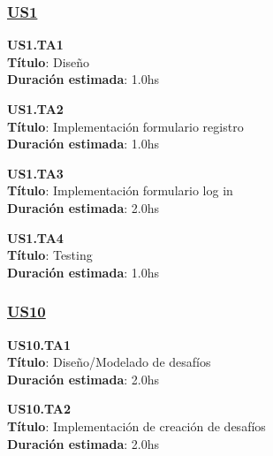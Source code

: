 \subsubsection*{\underline{US1}}

\begin{tcolorbox}
\textbf{US1.TA1} \\
\textbf{Título}: Diseño \\
\textbf{Duración estimada}: 1.0hs
\end{tcolorbox}
\vspace{10pt}

\begin{tcolorbox}
\textbf{US1.TA2} \\
\textbf{Título}:  Implementación formulario registro\\
\textbf{Duración estimada}: 1.0hs
\end{tcolorbox}
\vspace{10pt}

\begin{tcolorbox}
\textbf{US1.TA3} \\
\textbf{Título}: Implementación formulario log in \\
\textbf{Duración estimada}: 2.0hs
\end{tcolorbox}
\vspace{10pt}

\begin{tcolorbox}
\textbf{US1.TA4} \\
\textbf{Título}: Testing \\
\textbf{Duración estimada}: 1.0hs
\end{tcolorbox}
\vspace{10pt}

\subsubsection*{\underline{US10}}

\begin{tcolorbox}
\textbf{US10.TA1} \\
\textbf{Título}: Diseño/Modelado de desafíos \\
\textbf{Duración estimada}: 2.0hs
\end{tcolorbox}
\vspace{10pt}

\begin{tcolorbox}
\textbf{US10.TA2} \\
\textbf{Título}: Implementación de creación de desafíos \\
\textbf{Duración estimada}: 2.0hs
\end{tcolorbox}
\vspace{10pt}

